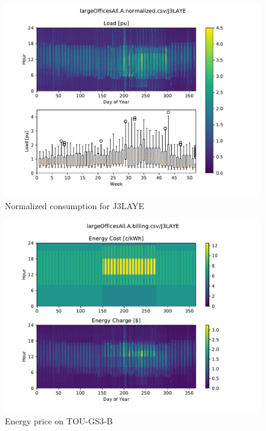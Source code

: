 \documentclass[11pt]{article}
\begin{document}
\begin{figure}[!h]
\centering
\includegraphics[width=\columnwidth, page=1, trim=0in 0.45in 0in 0.45in, clip]{visuals/J3LAYE.heatmap.pdf}
\caption{Normalized consumption for J3LAYE}
\label{fig:heatmap}
\end{figure}

\begin{figure}[!h]
\centering
\includegraphics[width=\columnwidth, page=1, trim=0in 3in 0in 0.45in, clip]{visuals/J3LAYE.billing.Heatmap.pdf}
\caption{Energy price on TOU-GS3-B}
\label{fig:toumap}
\end{figure}

\lipsum[1][1-7]
\end{document}
